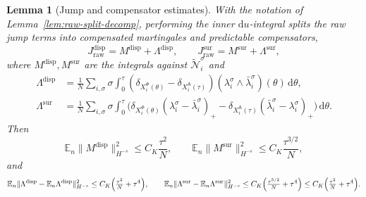 \documentclass[a4paper,fleqn]{cas-sc}
\newtheorem{lemma}[theorem]{Lemma}
\theoremstyle{definition}
\theoremstyle{remark}
\begin{document}
\begin{lemma}[Jump and compensator estimates]\label{lem:jump-compensator-est}
With the notation of Lemma~\ref{lem:raw-split-decomp}, performing the inner
$\mathrm du$-integral splits the raw jump terms into compensated martingales and
predictable compensators,
\[
J^{\mathrm{disp}}_{\mathrm{raw}}=M^{\mathrm{disp}}+\Lambda^{\mathrm{disp}},
\qquad
J^{\mathrm{sur}}_{\mathrm{raw}}=M^{\mathrm{sur}}+\Lambda^{\mathrm{sur}},
\]
where $M^{\mathrm{disp}},M^{\mathrm{sur}}$ are the integrals against
$\widetilde{\mathcal N}^\sigma_i$ and
\begin{align*}
\Lambda^{\mathrm{disp}}&=\frac1N\sum_{i,\sigma}\sigma\!\int_0^\tau\!
(\delta_{X^\Phi_i(\theta)}-\delta_{X^{\mathsf A}_i(\tau)})(\lambda^\sigma_i\wedge\bar\lambda^\sigma_i)(\theta)\,\mathrm d\theta,\\
\Lambda^{\mathrm{sur}}&=\frac1N\sum_{i,\sigma}\sigma\!\int_0^\tau\!
\bigl(\delta_{X^\Phi_i(\theta)}(\lambda^\sigma_i-\bar\lambda^\sigma_i)_+
-\delta_{X^{\mathsf A}_i(\tau)}(\bar\lambda^\sigma_i-\lambda^\sigma_i)_+\bigr)\,\mathrm d\theta.
\end{align*}
Then
\begin{equation}\label{eq:M-bounds}
\mathbb E_n\|M^{\mathrm{disp}}\|_{H^{-s}}^2\le C_K\frac{\tau^2}{N},
\qquad
\mathbb E_n\|M^{\mathrm{sur}}\|_{H^{-s}}^2\le C_K\frac{\tau^{3/2}}{N},
\end{equation}
and
\begin{equation}\label{eq:Lambda-bounds}
\mathbb E_n\|\Lambda^{\mathrm{disp}}-\mathbb E_n\Lambda^{\mathrm{disp}}\|_{H^{-s}}^2
\le C_K\Bigl(\tfrac{\tau^2}{N}+\tau^4\Bigr),
\qquad
\mathbb E_n\|\Lambda^{\mathrm{sur}}-\mathbb E_n\Lambda^{\mathrm{sur}}\|_{H^{-s}}^2
\le C_K\Bigl(\tfrac{\tau^{5/2}}{N}+\tau^4\Bigr)\le C_K\Bigl(\tfrac{\tau^2}{N}+\tau^4\Bigr).
\end{equation}
\end{lemma}
\end{document}
